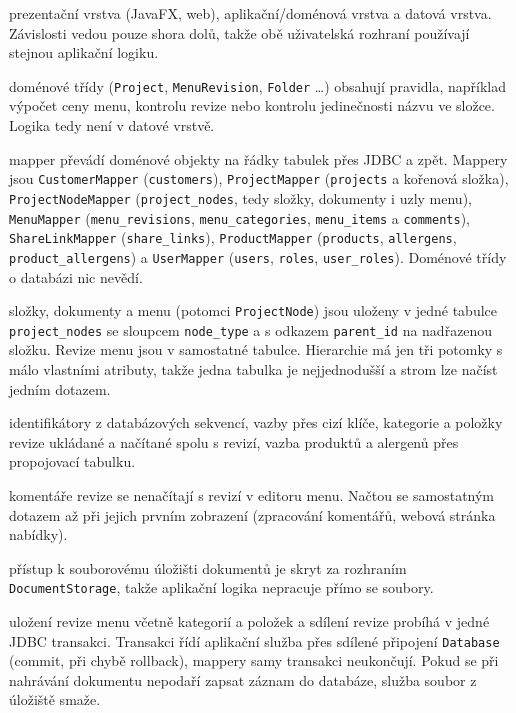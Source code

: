 \begin{description}[itemsep=2pt,style=unboxed]
  \item[Vícevrstvá architektura (Layers)] prezentační vrstva (JavaFX, web), aplikační/doménová vrstva a datová vrstva. Závislosti vedou pouze shora dolů, takže obě uživatelská rozhraní používají stejnou aplikační logiku.
  \item[Domain Model] doménové třídy (\texttt{Project}, \texttt{MenuRevision}, \texttt{Folder} \dots) obsahují pravidla, například výpočet ceny menu, kontrolu revize nebo kontrolu jedinečnosti názvu ve složce. Logika tedy není v datové vrstvě.
  \item[Data Mapper] mapper převádí doménové objekty na řádky tabulek přes JDBC a zpět. Mappery jsou \texttt{CustomerMapper} (\texttt{customers}), \texttt{ProjectMapper} (\texttt{projects} a kořenová složka), \texttt{ProjectNodeMapper} (\texttt{project\_nodes}, tedy složky, dokumenty i uzly menu), \texttt{MenuMapper} (\texttt{menu\_revisions}, \texttt{menu\_categories}, \texttt{menu\_items} a \texttt{comments}), \texttt{ShareLinkMapper} (\texttt{share\_links}), \texttt{ProductMapper} (\texttt{products}, \texttt{allergens}, \texttt{product\_allergens}) a \texttt{UserMapper} (\texttt{users}, \texttt{roles}, \texttt{user\_roles}). Doménové třídy o databázi nic nevědí.
  \item[Single Table Inheritance] složky, dokumenty a menu (potomci \texttt{ProjectNode}) jsou uloženy v jedné tabulce \texttt{project\_nodes} se sloupcem \texttt{node\_type} a s odkazem \texttt{parent\_id} na nadřazenou složku. Revize menu jsou v samostatné tabulce. Hierarchie má jen tři potomky s málo vlastními atributy, takže jedna tabulka je nejjednodušší a strom lze načíst jedním dotazem.
  \item[Identity Field, Foreign Key Mapping, Dependent Mapping, Association Table Mapping] identifikátory z databázových sekvencí, vazby přes cizí klíče, kategorie a položky revize ukládané a načítané spolu s revizí, vazba produktů a alergenů přes propojovací tabulku.
  \item[Lazy Load] komentáře revize se nenačítají s revizí v editoru menu. Načtou se samostatným dotazem až při jejich prvním zobrazení (zpracování komentářů, webová stránka nabídky).
  \item[Gateway] přístup k souborovému úložišti dokumentů je skryt za rozhraním \texttt{DocumentStorage}, takže aplikační logika nepracuje přímo se soubory.
  \item[Transakce] uložení revize menu včetně kategorií a položek a sdílení revize probíhá v jedné JDBC transakci. Transakci řídí aplikační služba přes sdílené připojení \texttt{Database} (commit, při chybě rollback), mappery samy transakci neukončují. Pokud se při nahrávání dokumentu nepodaří zapsat záznam do databáze, služba soubor z úložiště smaže.
\end{description}

